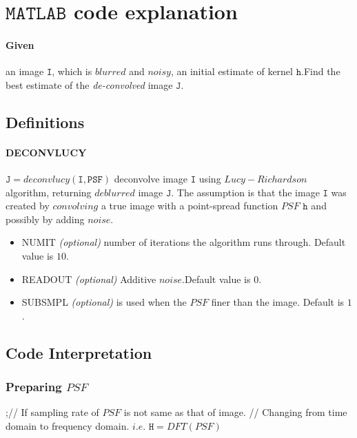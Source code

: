 \documentclass[a4paper]{book}
\begin{document}
\section{\Large $ \mathtt{MATLAB} $ code explanation}\label{secMATLAB}

\paragraph* {Given} an image $\mathtt{I}$, which is $ \textit{blurred} $ and $ \textit{noisy} $, an initial estimate of kernel $\mathtt{h}$.Find the best estimate of the \textit{de-convolved} image $ \mathtt{J}$.\cite{matlabpaper1,matlabpaper2} 

\subsection{Definitions}
\paragraph*{\normalsize DECONVLUCY}$\mathtt{J} = deconvlucy(\mathtt{I,PSF})$ deconvolve image $ \mathtt{I} $ using $ Lucy-Richardson $ algorithm, returning $ deblurred $ image $ \mathtt{J} $. The assumption is that the image $ \mathtt{I} $ was created by $ convolving $ a true image with a point-spread function $ PSF$ $\mathtt{h} $ and possibly by adding $ noise $.\\
\begin{itemize}
	\item NUMIT \textit{(optional)} number of iterations the algorithm runs through. Default value is $ 10 $.
	\item READOUT \textit{(optional)} Additive $ noise $.Default value is $ 0 $.
	\item SUBSMPL \textit{(optional)} is used when the $ PSF $ finer than the image. Default is $ 1 $.
\end{itemize}
%
%

\subsection{Code Interpretation}
\subsubsection{Preparing $ PSF $}
;// If sampling rate of $ PSF $ is not same as that of image.
// Changing from time domain to frequency domain. $ i.e.$ $ \mathtt{H} = DFT(PSF)$
\end{document}

